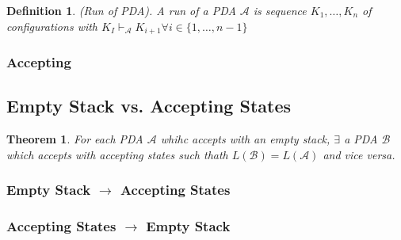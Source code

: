 \documentclass[a3paper, 8pt]{extarticle}
\newtheorem{theorem}{Theorem}[section]
\newtheorem*{definition}{Definition}
\begin{document}
\begin{multicols*}{6}
\begin{definition}
    (Run of PDA). A run of a PDA $\mathcal{A}$ is sequence $K_1, \dots, K_n$ of configurations with $K_I \vdash_\mathcal{A} K_{i+1} \forall i \in \{1, \dots, n-1\}$
\end{definition}

\subsubsection{Accepting}

\subsection{Empty Stack vs. Accepting States}

\begin{theorem}
    For each PDA $\mathcal{A}$ whihc accepts with an empty stack, $\exists$ a PDA $\mathcal{B}$ which accepts with accepting states such thath $L(\mathcal{B})=L(\mathcal{A})$ and vice versa.
    
\end{theorem}
\subsubsection{Empty Stack $\to$ Accepting States}

\subsubsection{Accepting States $\to$ Empty Stack}


\end{multicols*}
\end{document}
